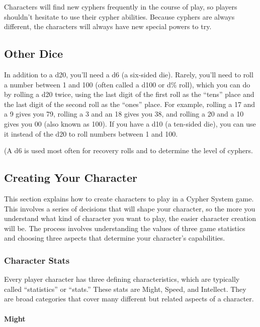 \begin{multicols}{2}
Characters will find new cyphers frequently in the course of play, so players shouldn’t hesitate to use their cypher abilities. Because cyphers are always different, the characters will always have new special powers to try.

\subsection{Other Dice}

In addition to a d20, you’ll need a d6 (a six-sided die). Rarely, you’ll need to roll a number between 1 and 100 (often called a d100 or d\% roll), which you can do by rolling a d20 twice, using the last digit of the first roll as the “tens” place and the last digit of the second roll as the “ones” place. For example, rolling a 17 and a 9 gives you 79, rolling a 3 and an 18 gives you 38, and rolling a 20 and a 10 gives you 00 (also known as 100). If you have a d10 (a ten-sided die), you can use it instead of the d20 to roll numbers between 1 and 100.

(A d6 is used most often for recovery rolls and to determine the level of cyphers.

\subsection{Creating Your Character}

This section explains how to create characters to play in a Cypher System game. This involves a series of decisions that will shape your character, so the more you understand what kind of character you want to play, the easier character creation will be. The process involves understanding the values of three game statistics and choosing three aspects that determine your character’s capabilities.

\subsubsection{Character Stats}

Every player character has three defining characteristics, which are typically called “statistics” or “stats.” These stats are Might, Speed, and Intellect. They are broad categories that cover many different but related aspects of a character.

\paragraph{Might}


\end{multicols}
